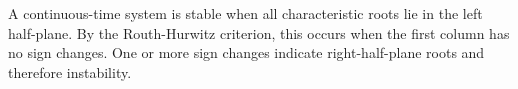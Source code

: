 \begin{enumerate}[label=\thesubsection.\arabic*, ref=\thesubsection.\theenumi,itemsep=0pt]
\begin{itemize}
\solution
A continuous-time system is stable when all characteristic roots lie in the left half-plane. By the Routh-Hurwitz criterion, this occurs when the first column has no sign changes. One or more sign changes indicate right-half-plane roots and therefore instability.
\end{itemize}

\end{enumerate}
